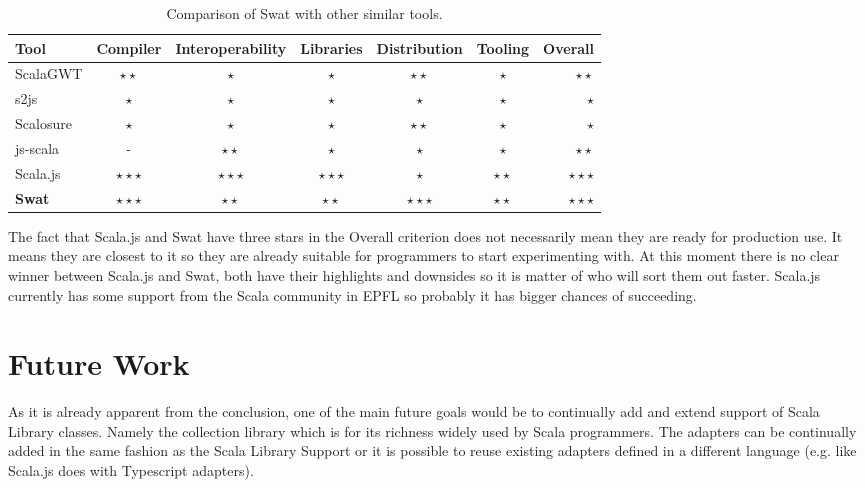 \documentclass[12pt,a4paper]{report}
\begin{document}
\begin{table}[h]\footnotesize
	\def\arraystretch{1.5}
	\centering
	\begin{tabular}{l || c | c | c | c | c  || r}
		Tool				& Compiler 						& Interoperability	& Libraries 				& Distribution			& Tooling 					& Overall 					\\
		\hline						
	  ScalaGWT		& $\star\star$				&	$\star$						& $\star$						& $\star\star$			&	$\star$						& $\star\star$			\\
		s2js				& $\star$							& $\star$ 					& $\star$ 					&	$\star$						& $\star$						& $\star$			 			\\
		Scalosure		& $\star$							& $\star$ 					& $\star$ 					& $\star\star$			& $\star$						& $\star$			  		\\
		js-scala		& - 									& $\star\star$ 			& $\star$						& $\star$ 					& $\star$ 					& $\star\star$ 			\\
		Scala.js		& $\star\star\star$ 	& $\star\star\star$	& $\star\star\star$ &	$\star$						& $\star\star$			& $\star\star\star$ \\
		{\bf Swat}	& $\star\star\star$ 	& $\star\star$			& $\star\star$			& $\star\star\star$	& $\star\star$			& $\star\star\star$ \\
	\end{tabular}
	\caption{Comparison of Swat with other similar tools.}
	\label{tbl:Comparison}
\end{table}

The fact that Scala.js and Swat have three stars in the Overall criterion does not necessarily mean they are ready for production use. It means they are closest to it so they are already suitable for programmers to start experimenting with. At this moment there is no clear winner between Scala.js and Swat, both have their highlights and downsides so it is matter of who will sort them out faster. Scala.js currently has some support from the Scala community in EPFL so probably it has bigger chances of succeeding.

\section{Future Work}

As it is already apparent from the conclusion, one of the main future goals would be to continually add and extend support of Scala Library classes. Namely the collection library which is for its richness widely used by Scala programmers. The adapters can be continually added in the same fashion as the Scala Library Support or it is possible to reuse existing adapters defined in a different language (e.g. like Scala.js does with Typescript adapters).
\end{document}
